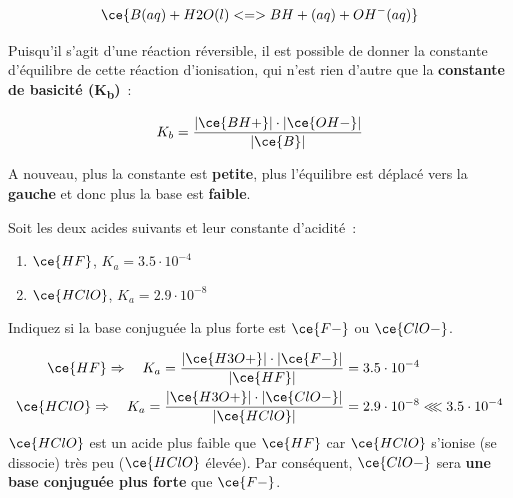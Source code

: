 \documentclass[
  11pt,
  a4paper,
  openany]{book}
\providecommand{\tightlist}{%
  \setlength{\itemsep}{0pt}\setlength{\parskip}{0pt}}
\begin{document}
\[
\ce{B(aq) + H2O(l) <=> BH+(aq) + OH^{-}(aq)}
\]

Puisqu'il s'agit d'une réaction réversible, il est possible de donner la constante d'équilibre de cette réaction d'ionisation, qui n'est rien d'autre que la \textbf{constante de basicité (K\textsubscript{b})}~:

\[
K_b = \frac{|\ce{BH+}| \cdot |\ce{OH-}|}{|\ce{B}|}
\]

A nouveau, plus la constante est \textbf{petite}, plus l'équilibre est déplacé vers la \textbf{gauche} et donc plus la base est \textbf{faible}.

\begin{Exercise}
Soit les deux acides suivants et leur constante d'acidité~:

\begin{enumerate}
\def\labelenumi{\alph{enumi}.}
\tightlist
\item
  \(\ce{HF}\), \(K_a = 3.5 \cdot 10^{-4}\)
\item
  \(\ce{HClO}\), \(K_a = 2.9 \cdot 10^{-8}\)
\end{enumerate}

Indiquez si la base conjuguée la plus forte est \(\ce{F-}\) ou \(\ce{ClO-}\).

\end{Exercise}

\begin{Answer}
\[
\begin{split}
  \ce{HF} \Rightarrow \quad K_a = \frac{|\ce{H3O+}| \cdot |\ce{F-}|}{|\ce{HF}|} &= 3.5 \cdot 10^{-4} \\
  \ce{HClO} \Rightarrow \quad K_a = \frac{|\ce{H3O+}| \cdot |\ce{ClO-}|}{|\ce{HClO}|} &= 2.9 \cdot 10^{-8} \lll 3.5 \cdot 10^{-4}
\end{split}
\]
\(\ce{HClO}\) est un acide plus faible que \(\ce{HF}\) car \(\ce{HClO}\) s'ionise (se dissocie) très peu (\textbar{}\(\ce{HClO}\)\textbar{} élevée). Par conséquent, \(\ce{ClO-}\) sera \textbf{une base conjuguée plus forte} que \(\ce{F-}\).

\end{Answer}

\clearpage
\end{document}
